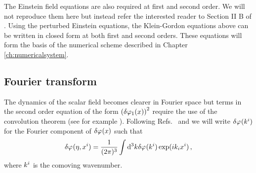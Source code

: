 The Einstein field equations are also required at first and second order. We
will not reproduce them here but instead refer the interested reader to Section
II B of .
Using the perturbed Einstein equations, the Klein-Gordon equations above can be
written in closed form at both first and second orders. These equations will
form the basis of the numerical scheme described in Chapter \ref{ch:numericalsystem}.

\subsection{Fourier transform}
\label{sec:fourier-perts}
% 
The dynamics of the scalar field becomes clearer in Fourier space but terms in
the second order equation of the form $\left(\delta\varphi_{1}(x)\right)^2$ require the use
of the convolution theorem (see for example ).
Following Refs.~\cite{Malik:2006ir} and \cite{book:liddle} we will write
$\delta\varphi_{}(k^i)$
for the Fourier component of $\delta\varphi_{}(x)$ such that
% 
\begin{equation}
 \delta\varphi_{}(\eta, x^i) = \frac{1}{(2 \pi)^3} \int \mathrm{d}^3k \delta\varphi_{}(k^i) \exp (i k_i
x^i)
\,,
\end{equation}
% 
where $k^i$ is the comoving wavenumber.


